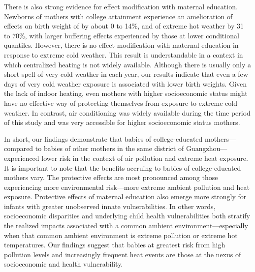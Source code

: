 There is also strong evidence for effect modification with maternal
education. Newborns of mothers with college attainment experience an amelioration of
effects on birth weight of \PARPMTEN by about 0 to 14\%, and of extreme
hot weather by 31 to 70\%, with larger buffering effects experienced by those at lower conditional quantiles. However, there is no effect modification with maternal education in response to extreme cold
weather. This result is understandable in a context in which
centralized heating is not widely available. Although there is usually only a short
spell of very cold weather in each year, our results indicate that even
a few days of very cold weather exposure is associated with lower birth
weights. Given the lack of indoor heating, even mothers with higher
socioeconomic status might have no effective way of protecting
themselves from exposure to extreme cold weather. In contrast, air
conditioning was widely available during the time period of this study
and was very accessible for higher socioeconomic status mothers.

In short, our findings demonstrate that babies of college-educated
mothers---compared to babies of other mothers in the same district of
Guangzhou---experienced lower risk in the context of air
pollution and extreme heat exposure. It is important to note that the
benefits accruing to babies of college-educated mothers vary. The protective effects are most pronounced among those
experiencing more environmental risk---more extreme ambient pollution
and heat exposure. Protective effects of maternal education also emerge
more strongly for infants with greater unobserved innate
vulnerabilities. In other words, socioeconomic disparities
and underlying child health vulnerabilities both stratify the realized
impacts associated with a common ambient environment---especially when
that common ambient environment is extreme pollution or extreme hot temperatures.
Our findings suggest that babies at greatest risk from high pollution
levels and increasingly frequent heat events are those at the nexus of
socioeconomic and health vulnerability.

\pagebreak
